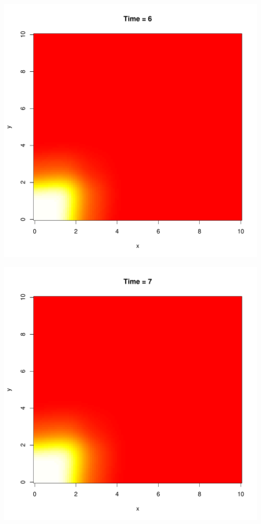 \documentclass{tufte-handout}\usepackage[]{graphicx}\usepackage[]{xcolor}
\makeatletter
\def\maxwidth{ %
  \ifdim\Gin@nat@width>\linewidth
    \linewidth
  \else
    \Gin@nat@width
  \fi
}
\newenvironment{knitrout}{}{} %
\makeatother
\begin{document}
\begin{knitrout}
\includegraphics[width=\maxwidth]{figure/unnamed-chunk-4-7} 

\includegraphics[width=\maxwidth]{figure/unnamed-chunk-4-8} 


\end{knitrout}
\end{document}
